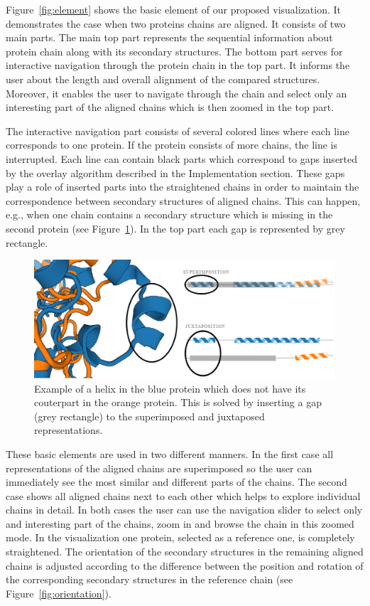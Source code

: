 \documentclass[twocolumn]{bmcart}%
\begin{document}
Figure~\ref{fig:element} shows the basic element of our proposed visualization.
It demonstrates the case when two proteins chains are aligned.
It consists of two main parts.
The main top part represents the sequential information about protein chain along with its secondary structures.
The bottom part serves for interactive navigation through the protein chain in the top part. 
It informs the user about the length and overall alignment of the compared structures.
Moreover, it enables the user to navigate through the chain and select only an interesting part of the aligned chains which is then zoomed in the top part.


The interactive navigation part consists of several colored lines where each line corresponds to one protein.
If the protein consists of more chains, the line is interrupted.
Each line can contain black parts which correspond to gaps inserted by the overlay algorithm described in the Implementation section.
These gaps play a role of inserted parts into the straightened chains in order to maintain the correspondence between secondary structures of aligned chains. 
This can happen, e.g., when one chain contains a secondary structure which is missing in the second protein (see Figure~\ref{fig:gap}).
In the top part each gap is represented by grey rectangle.

\begin{figure}[ht]
  \centering
  \includegraphics[width=0.9\linewidth]{pics/gap2.png}
  \caption{Example of a helix in the blue protein which does not have its couterpart in the orange protein. This is solved by inserting a gap (grey rectangle) to the superimposed and juxtaposed representations.}
  \label{fig:gap}
\end{figure}

These basic elements are used in two different manners.
In the first case all representations of the aligned chains are superimposed so the user can immediately see the most similar and different parts of the chains.
The second case shows all aligned chains next to each other which helps to explore individual chains in detail.
In both cases the user can use the navigation slider to select only and interesting part of the chains, zoom in and browse the chain in this zoomed mode.
In the visualization one protein, selected as a reference one, is completely straightened.
The orientation of the secondary structures in the remaining aligned chains is adjusted according to the difference between the position and rotation of the corresponding secondary structures in the reference chain (see Figure~\ref{fig:orientation}).
\end{document}
